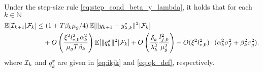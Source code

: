 

\begin{lemma}
\label{lem:gen2}
    Under the step-size rule  \eqref{eq:step_cond_beta_y_lambda}, it holds that for each $k \in \mathbb{N}$
    \begin{align}
    \mathbb{E}[\mathcal{I}_{k+1}| \mathcal{F}_k] &\le \left(1 + T \beta_k \mu_g / 4 \right) \mathbb{E}[\|y_{k+1} - y_{\lambda, k}^*\|^2 | \mathcal{F}_k] \nonumber\\
    &\quad + O\left(\frac{\xi^2 l_{*,0}^2 \alpha_k^2 }{\mu_gT \beta_k}\right) \mathbb{E}[\|q_k^x\|^2 | \mathcal{F}_k] + O\left( \frac{\delta_k}{\lambda_k^3} \frac{l_{f,0}^2}{\mu_g^2} \right) + O(\xi^2 l_{*,0}^2) \cdot (\alpha_k^2 \sigma_f^2 + \beta_k^2 \sigma_g^2).  \label{eq:y_star_lambda_contraction}
\end{align}
where $\mathcal{I}_k$ and $q_k^x$ are given in \eqref{eq:ikjk} and \eqref{eq:qk_def}, respectively.
\end{lemma}


